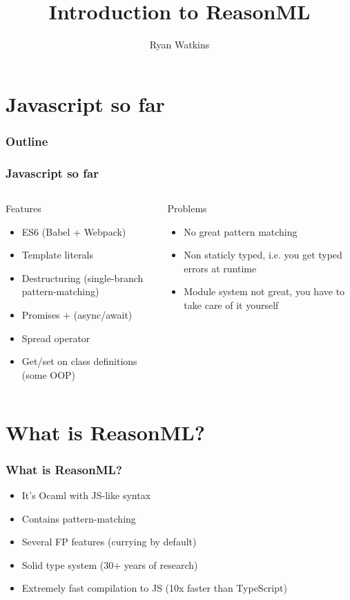 \documentclass{beamer}
\author{Ryan Watkins}
\title{Introduction to ReasonML}
\begin{document}
\begin{frame}
  \titlepage
\end{frame}


\section{Javascript so far}

\AtBeginSection[]{}
{
  \begin{frame}
    \frametitle{Outline}
    \tableofcontents[currentsection]
  \end{frame}
}

\begin{frame}
  \frametitle{Javascript so far}
  \begin{columns}
    \begin{block}{Features}
      \begin{itemize}
      \item<2-> ES6 (Babel + Webpack)
      \item<3-> Template literals
      \item<4-> Destructuring (single-branch pattern-matching)
      \item<5-> Promises + (async/await)
      \item<6-> Spread operator
      \item<7-> Get/set on class definitions (some OOP)
      \end{itemize}
    \end{block}
    \begin{block}{Problems}
      \begin{itemize}
      \item<8-> No great pattern matching
      \item<9-> Non staticly typed, i.e. you get typed errors at runtime
      \item<10-> Module system not great, you have to take care of it yourself
      \end{itemize}
    \end{block}
  \end{columns}
\end{frame}

\section{What is ReasonML?}
\begin{frame}
  \frametitle{What is ReasonML?}
  \pause
  \begin{itemize}
  \item<2-> It's Ocaml with JS-like syntax
  \item<3-> Contains pattern-matching
  \item<4-> Several FP features (currying by default)
  \item<5-> Solid type system (30+ years of research)
  \item<6-> Extremely fast compilation to JS (10x faster than TypeScript)
  \end{itemize}
\end{frame}
\end{document}

